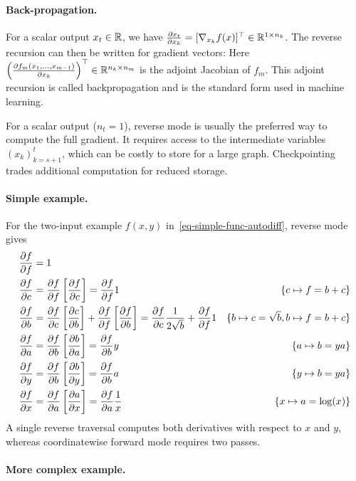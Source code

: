 \paragraph{Back-propagation.}

For a scalar output $x_t \in \mathbb{R}$, we have $\frac{ \partial x_t}{\partial x_k} = [\nabla_{x_k} f(x)]^\top \in \mathbb{R}^{1 \times n_k}$. The reverse recursion can then be written for gradient vectors:
Here $\left( \frac{ \partial f_m(x_1,\ldots,x_{m-1})}{\partial x_k} \right)^\top \in \mathbb{R}^{n_k \times n_m}$ is the adjoint Jacobian of $f_m$. This adjoint recursion is called backpropagation and is the standard form used in machine learning.

For a scalar output ($n_t=1$), reverse mode is usually the preferred way to compute the full gradient. It requires access to the intermediate variables $(x_k)_{k=s+1}^t$, which can be costly to store for a large graph. Checkpointing trades additional computation for reduced storage.

\paragraph{Simple example.}

For the two-input example $f(x,y)$ in~\eqref{eq-simple-func-autodiff}, reverse mode gives
\begin{align*}
		\frac{ \partial f}{\partial f} &= 1 &\\
		\frac{ \partial f}{\partial c} &= \frac{ \partial f}{\partial f} \left[\frac{ \partial f}{\partial c}\right] = \frac{ \partial f}{\partial f} 1 &
			\{ c \mapsto f = b+c\}\\
		\frac{ \partial f}{\partial b} &= \frac{ \partial f}{\partial c} \left[\frac{ \partial c}{\partial b}\right] + \frac{ \partial f}{\partial f} \left[\frac{ \partial f}{\partial b}\right] = \frac{ \partial f}{\partial c} \frac{1}{2\sqrt{b}} + \frac{ \partial f}{\partial f} 1 & 
			\{ b \mapsto c=\sqrt{b}, b \mapsto f=b+c\} \\
		\frac{ \partial f}{\partial a} &= \frac{ \partial f}{\partial b} \left[\frac{ \partial b}{\partial a}\right] = \frac{ \partial f}{\partial b} y & 
			\{ a \mapsto b=y a\} \\
		\frac{ \partial f}{\partial y} &= \frac{ \partial f}{\partial b} \left[\frac{ \partial b}{\partial y}\right] = \frac{ \partial f}{\partial b} a & 
			\{ y \mapsto b=ya\} \\
		\frac{ \partial f}{\partial x} &= \frac{ \partial f}{\partial a} \left[\frac{ \partial a}{\partial x}\right] = \frac{ \partial f}{\partial a} \frac{1}{x} & 
			\{ x \mapsto a=\log(x)\}
\end{align*}
A single reverse traversal computes both derivatives with respect to $x$ and $y$, whereas coordinatewise forward mode requires two passes.

\paragraph{More complex example.}

